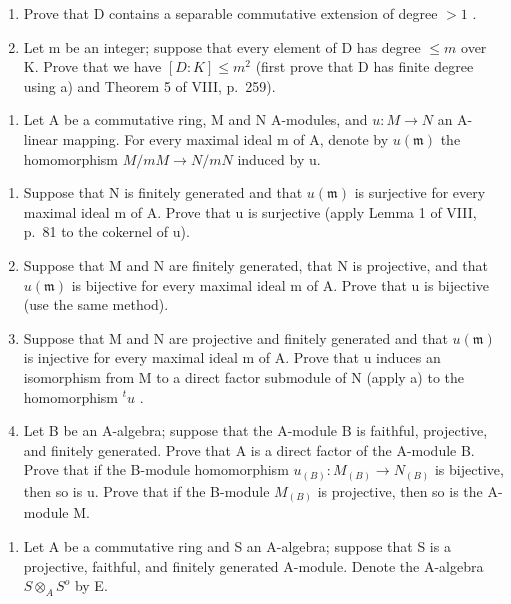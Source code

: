 \begin{enumerate}
\def\labelenumi{\alph{enumi})}
\item
  Prove that D contains a separable commutative extension of degree \(>1\) .
\item
  Let m be an integer; suppose that every element of D has degree \(\leqslant m\) over K. Prove that we have \([D:K]\leqslant m^{2}\) (first prove that D has finite degree using a) and Theorem 5 of VIII, p.~259).
\end{enumerate}

\begin{enumerate}
\def\labelenumi{\arabic{enumi})}
\setcounter{enumi}{6}
\tightlist
\item
  Let A be a commutative ring, M and N A-modules, and \(u: M \to N\) an A-linear mapping. For every maximal ideal m of A, denote by \(u(\mathfrak{m})\) the homomorphism \(M/mM \to N/mN\) induced by u.
\end{enumerate}

\begin{enumerate}
\def\labelenumi{\alph{enumi})}
\item
  Suppose that N is finitely generated and that \(u(\mathfrak{m})\) is surjective for every maximal ideal m of A. Prove that u is surjective (apply Lemma 1 of VIII, p.~81 to the cokernel of u).
\item
  Suppose that M and N are finitely generated, that N is projective, and that \(u(\mathfrak{m})\) is bijective for every maximal ideal m of A. Prove that u is bijective (use the same method).
\item
  Suppose that M and N are projective and finitely generated and that \(u(\mathfrak{m})\) is injective for every maximal ideal m of A. Prove that u induces an isomorphism from M to a direct factor submodule of N (apply a) to the homomorphism \(^{t}u\) .
\item
  Let B be an A-algebra; suppose that the A-module B is faithful, projective, and finitely generated. Prove that A is a direct factor of the A-module B. Prove that if the B-module homomorphism \(u_{(B)} : M_{(B)} \to N_{(B)}\) is bijective, then so is u. Prove that if the B-module \(M_{(B)}\) is projective, then so is the A-module M.
\end{enumerate}

\begin{enumerate}
\def\labelenumi{\arabic{enumi})}
\setcounter{enumi}{7}
\tightlist
\item
  Let A be a commutative ring and S an A-algebra; suppose that S is a projective, faithful, and finitely generated A-module. Denote the A-algebra \(S \otimes_{A} S^{o}\) by E.
\end{enumerate}

